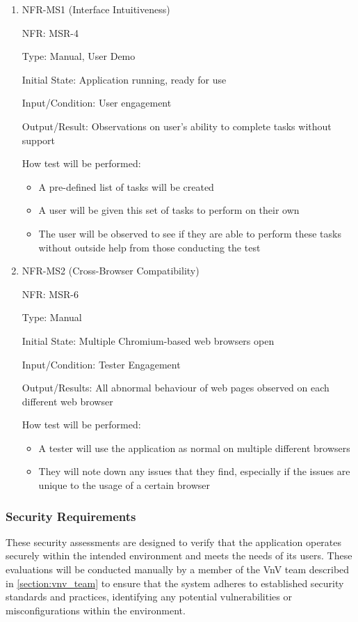 \documentclass[12pt, titlepage]{article}
\begin{document}
\begin{enumerate}
\item{NFR-MS1 (Interface Intuitiveness)\\}

NFR: MSR-4 

Type: Manual, User Demo

Initial State: Application running, ready for use

Input/Condition: User engagement

Output/Result: Observations on user's ability to complete tasks without support

How test will be performed: 
\begin{itemize}
  \item  A pre-defined list of tasks will be created 
  \item A user will be given this set of tasks to perform on their own
  \item The user will be observed to see if they are able to perform these tasks
  without outside help from those conducting the test 
\end{itemize}
					
\item{NFR-MS2 (Cross-Browser Compatibility)\\}

NFR: MSR-6

Type: Manual

Initial State: Multiple Chromium-based web browsers open

Input/Condition: Tester Engagement

Output/Results: All abnormal behaviour of web pages observed on each different
web browser

How test will be performed: 
\begin{itemize}
  \item A tester will use the application as normal on multiple different
  browsers
  \item They will note down any issues that they find, especially if the issues
  are unique to the usage of a certain browser
\end{itemize}
\end{enumerate}

\subsubsection{Security Requirements}
These security assessments are designed to verify that the application operates
securely within the intended environment and meets the needs of its users. These
evaluations will be conducted manually by a member of the VnV team described in \ref{section:vnv_team}
to ensure that the system adheres to established security standards and practices,
identifying any potential vulnerabilities or misconfigurations within the environment.
\end{document}

